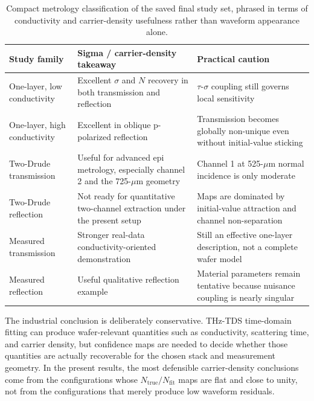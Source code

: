 \documentclass[11pt]{article}
\begin{document}
\begin{table}[htbp]
\centering
\begin{threeparttable}
\caption{Compact metrology classification of the saved final study set, phrased in terms of conductivity and carrier-density usefulness rather than waveform appearance alone.}
\label{tab:industrial-takeaway-results}
\small
\begin{tabularx}{\linewidth}{@{}p{2.6cm}Y Y@{}}
\toprule
Study family & Sigma / carrier-density takeaway & Practical caution \\
\midrule
One-layer, low conductivity & Excellent \(\sigma\) and \(N\) recovery in both transmission and reflection & \(\tau\)-\(\sigma\) coupling still governs local sensitivity \\
One-layer, high conductivity & Excellent in oblique p-polarized reflection & Transmission becomes globally non-unique even without initial-value sticking \\
Two-Drude transmission & Useful for advanced epi metrology, especially channel 2 and the 725-\(\mu\)m geometry & Channel 1 at 525-\(\mu\)m normal incidence is only moderate \\
Two-Drude reflection & Not ready for quantitative two-channel extraction under the present setup & Maps are dominated by initial-value attraction and channel non-separation \\
Measured transmission & Stronger real-data conductivity-oriented demonstration & Still an effective one-layer description, not a complete wafer model \\
Measured reflection & Useful qualitative reflection example & Material parameters remain tentative because nuisance coupling is nearly singular \\
\bottomrule
\end{tabularx}
\end{threeparttable}
\end{table}

The industrial conclusion is deliberately conservative. THz-TDS time-domain fitting can produce wafer-relevant quantities such as conductivity, scattering time, and carrier density, but confidence maps are needed to decide whether those quantities are actually recoverable for the chosen stack and measurement geometry. In the present results, the most defensible carrier-density conclusions come from the configurations whose \(N_{\mathrm{true}}/N_{\mathrm{fit}}\) maps are flat and close to unity, not from the configurations that merely produce low waveform residuals.
\end{document}
